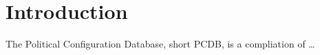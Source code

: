 \chapter{Introduction}\label{chap_introduction}
The Political Configuration Database, short PCDB, is a compliation of \ldots
\newpage